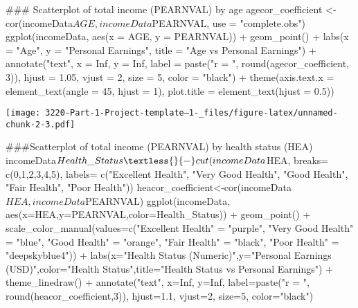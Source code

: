\documentclass[
  12pt,
]{article}
\newenvironment{Shaded}{\begin{snugshade}}{\end{snugshade}}
\newcommand{\NormalTok}[1]{#1}
\begin{document}
\begin{Shaded}
\begin{Highlighting}[]
\NormalTok{\#\#\# Scatterplot of total income (PEARNVAL) by age}
\NormalTok{agecor\_coefficient \textless{}{-} cor(incomeData$AGE, incomeData$PEARNVAL, use = "complete.obs")}
\NormalTok{ggplot(incomeData, aes(x = AGE, y = PEARNVAL)) +}
\NormalTok{  geom\_point() +}
\NormalTok{  labs(x = "Age", y = "Personal Earnings", title = "Age vs Personal Earnings") +}
\NormalTok{  annotate("text", x = Inf, y = Inf, label = paste("r = ", round(agecor\_coefficient, 3)),}
\NormalTok{           hjust = 1.05, vjust = 2, size = 5, color = "black") +}
\NormalTok{  theme(axis.text.x = element\_text(angle = 45, hjust = 1),}
\NormalTok{        plot.title = element\_text(hjust = 0.5))}
\end{Highlighting}
\end{Shaded}

\texttt{[image: 3220-Part-1-Project-template--1-\_files/figure-latex/unnamed-chunk-2-3.pdf]}

\begin{Shaded}
\begin{Highlighting}[]
\NormalTok{\#\#\#Scatterplot of total income (PEARNVAL) by health status (HEA) }
\NormalTok{incomeData$Health\_Status\textless{}{-}cut(incomeData$HEA,}
\NormalTok{                              breaks= c(0,1,2,3,4,5),}
\NormalTok{                              labels= c("Excellent Health",}
\NormalTok{                                        "Very Good Health",}
\NormalTok{                                        "Good Health",}
\NormalTok{                                        "Fair Health",}
\NormalTok{                                        "Poor Health"))}
\NormalTok{heacor\_coefficient\textless{}{-}cor(incomeData$HEA,incomeData$PEARNVAL)}
\NormalTok{ggplot(incomeData, aes(x=HEA,y=PEARNVAL,color=Health\_Status)) + }
\NormalTok{  geom\_point() + }
\NormalTok{  scale\_color\_manual(values=c("Excellent Health" = "purple",}
\NormalTok{                              "Very Good Health" = "blue",}
\NormalTok{                              "Good Health" = "orange",}
\NormalTok{                              "Fair Health" = "black",}
\NormalTok{                              "Poor Health" = "deepskyblue4")) +}
\NormalTok{  labs(x="Health Status (Numeric)",y="Personal Earnings (USD)",color="Health Status",title="Health Status vs Personal Earnings") +}
\NormalTok{  theme\_linedraw() +}
\NormalTok{  annotate("text", x=Inf, y=Inf, label=paste("r = ", round(heacor\_coefficient,3)), }
\NormalTok{           hjust=1.1, vjust=2, size=5, color="black")}
\end{Highlighting}
\end{Shaded}
\end{document}
